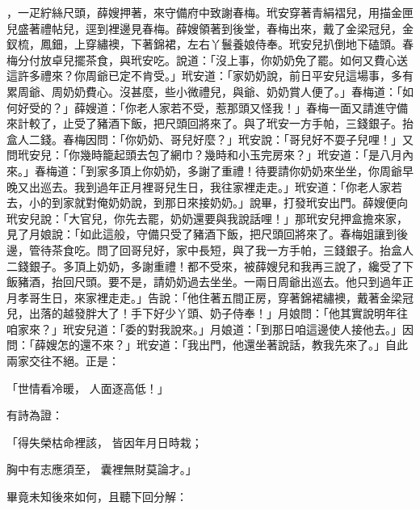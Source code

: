 ，一疋紵絲尺頭，薛嫂押著，來守備府中致謝春梅。玳安穿著青絹褶兒，用描金匣兒盛著禮帖兒，逕到裡邊見春梅。薛嫂領著到後堂，春梅出來，戴了金梁冠兒，金釵梳，鳳鈿，上穿繡襖，下著錦裙，左右丫鬟養娘侍奉。玳安兒扒倒地下磕頭。春梅分付放卓兒擺茶食，與玳安吃。說道：「沒上事，你奶奶免了罷。如何又費心送這許多禮來？你周爺已定不肯受。」玳安道：「家奶奶說，前日平安兒這場事，多有累周爺、周奶奶費心。沒甚麼，些小微禮兒，與爺、奶奶賞人便了。」春梅道：「如何好受的？」薛嫂道：「你老人家若不受，惹那頭又怪我！」春梅一面又請進守備來計較了，止受了豬酒下飯，把尺頭回將來了。與了玳安一方手帕，三錢銀子。抬盒人二錢。春梅因問：「你奶奶、哥兒好麼？」玳安說：「哥兒好不耍子兒哩！」又問玳安兒：「你幾時籠起頭去包了網巾？幾時和小玉完房來？」玳安道：「是八月內來。」春梅道：「到家多頂上你奶奶，多謝了重禮！待要請你奶奶來坐坐，你周爺早晚又出巡去。我到過年正月裡哥兒生日，我往家裡走走。」玳安道：「你老人家若去，小的到家就對俺奶奶說，到那日來接奶奶。」說畢，打發玳安出門。薛嫂便向玳安兒說：「大官兒，你先去罷，奶奶還要與我說話哩！」那玳安兒押盒擔來家，見了月娘說：「如此這般，守備只受了豬酒下飯，把尺頭回將來了。春梅姐讓到後邊，管待茶食吃。問了回哥兒好，家中長短，與了我一方手帕，三錢銀子。抬盒人二錢銀子。多頂上奶奶，多謝重禮！都不受來，被薛嫂兒和我再三說了，纔受了下飯豬酒，抬回尺頭。要不是，請奶奶過去坐坐。一兩日周爺出巡去。他只到過年正月孝哥生日，來家裡走走。」告說：「他住著五間正房，穿著錦裙繡襖，戴著金梁冠兒，出落的越發胖大了！手下好少丫頭、奶子侍奉！」月娘問：「他其實說明年往咱家來？」玳安兒道：「委的對我說來。」月娘道：「到那日咱這邊使人接他去。」因問：「薛嫂怎的還不來？」玳安道：「我出門，他還坐著說話，教我先來了。」自此兩家交往不絕。正是：

「世情看冷暖，  人面逐高低！」

有詩為證：

「得失榮枯命裡該，  皆因年月日時栽；

胸中有志應須至，  囊裡無財莫論才。」

畢竟未知後來如何，且聽下回分解：

